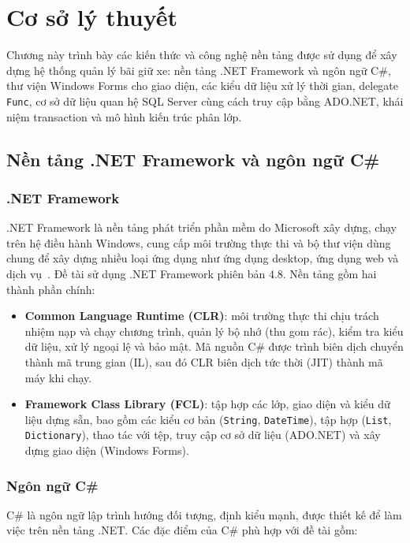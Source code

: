 \chapter{Cơ sở lý thuyết}

Chương này trình bày các kiến thức và công nghệ nền tảng được sử dụng để xây dựng hệ thống quản lý bãi giữ xe: nền tảng .NET Framework và ngôn ngữ C\#, thư viện Windows Forms cho giao diện, các kiểu dữ liệu xử lý thời gian, delegate \texttt{Func}, cơ sở dữ liệu quan hệ SQL Server cùng cách truy cập bằng ADO.NET, khái niệm transaction và mô hình kiến trúc phân lớp.

\section{Nền tảng .NET Framework và ngôn ngữ C\#}

\subsection{.NET Framework}

.NET Framework là nền tảng phát triển phần mềm do Microsoft xây dựng, chạy trên hệ điều hành Windows, cung cấp môi trường thực thi và bộ thư viện dùng chung để xây dựng nhiều loại ứng dụng như ứng dụng desktop, ứng dụng web và dịch vụ~\cite{troelsen2022}. Đề tài sử dụng .NET Framework phiên bản 4.8. Nền tảng gồm hai thành phần chính:

\begin{itemize}
  \item \textbf{Common Language Runtime (CLR)}: môi trường thực thi chịu trách nhiệm nạp và chạy chương trình, quản lý bộ nhớ (thu gom rác), kiểm tra kiểu dữ liệu, xử lý ngoại lệ và bảo mật. Mã nguồn C\# được trình biên dịch chuyển thành mã trung gian (IL), sau đó CLR biên dịch tức thời (JIT) thành mã máy khi chạy.
  \item \textbf{Framework Class Library (FCL)}: tập hợp các lớp, giao diện và kiểu dữ liệu dựng sẵn, bao gồm các kiểu cơ bản (\texttt{String}, \texttt{DateTime}), tập hợp (\texttt{List}, \texttt{Dictionary}), thao tác với tệp, truy cập cơ sở dữ liệu (ADO.NET) và xây dựng giao diện (Windows Forms).
\end{itemize}

\subsection{Ngôn ngữ C\#}

C\# là ngôn ngữ lập trình hướng đối tượng, định kiểu mạnh, được thiết kế để làm việc trên nền tảng .NET. Các đặc điểm của C\# phù hợp với đề tài gồm:

